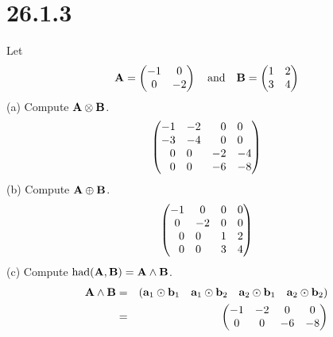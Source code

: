\section*{26.1.3}
Let
$${\bf A}=\left(\begin{matrix}
-1 & 0\cr
0 & -2
\end{matrix}\right)
\quad\hbox{and}\quad
{\bf B}=\left(\begin{matrix}
1 & 2\cr
3 & 4
\end{matrix}\right)
$$
(a) Compute $\bf A\otimes B$.
$$\left(\begin{matrix}
\begin{matrix}-1 & -2\cr -3 & -4\end{matrix}
 & \begin{matrix}0 & 0\cr 0 & 0\end{matrix}\cr
\begin{matrix}0 & 0\cr 0 & 0\end{matrix}
 & \begin{matrix}-2 & -4\cr -6 & -8\end{matrix}
\end{matrix}\right)
$$
(b) Compute $\bf A\oplus B$.
$$\left(\begin{matrix}
\begin{matrix}-1 & 0\cr 0 & -2\end{matrix}
 & \begin{matrix}0 & 0\cr 0 & 0\end{matrix}\cr
\begin{matrix}0 & 0\cr 0 & 0\end{matrix}
 & \begin{matrix}1 & 2\cr 3 & 4\end{matrix}
\end{matrix}\right)
$$
(c) Compute $\mathop{\rm had}(\bf A,B)=A\wedge B$.
\begin{eqnarray*}
{\bf A\wedge B}&=&(\begin{matrix}
{\bf a}_1\odot {\bf b}_1 & {\bf a}_1\odot {\bf b}_2 & {\bf a}_2\odot {\bf b}_1 & {\bf a}_2\odot {\bf b}_2\end{matrix})\\
&=&\left(\begin{matrix}
-1 & -2 & 0 & 0\cr
0 & 0 & -6 & -8
\end{matrix}\right)
\end{eqnarray*}
